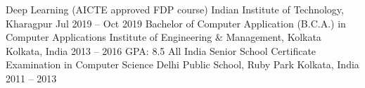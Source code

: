 \begin{cventries}
	\cventry
	{Deep Learning (AICTE approved FDP course)}
	{Indian Institute of Technology, Kharagpur}
	{}
	{Jul 2019 – Oct 2019}
	{}
	\cventry
	{Bachelor of Computer Application (B.C.A.) in Computer Applications}
	{Institute of Engineering \& Management, Kolkata}
	{Kolkata, India}
	{2013 – 2016}
	{GPA: 8.5}
	\cventry
	{All India Senior School Certificate Examination in Computer Science}
	{Delhi Public School, Ruby Park}
	{Kolkata, India}
	{2011 – 2013}
	{}
\end{cventries}